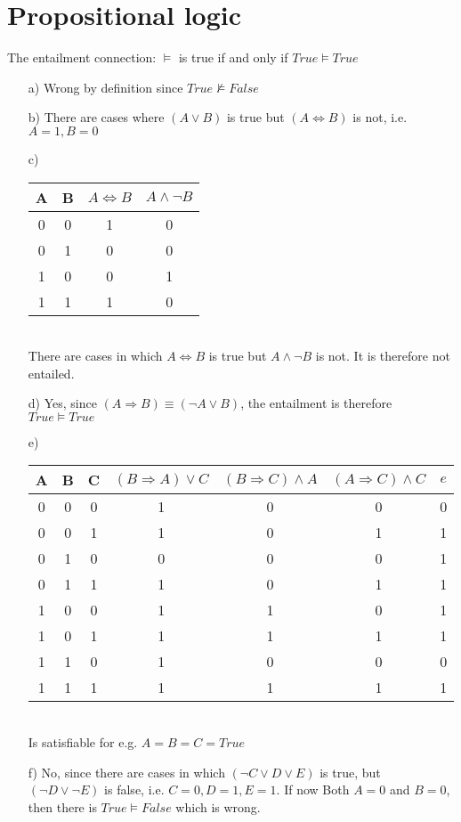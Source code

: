 \documentclass[a4paper]{article}
\begin{document}
\section{Propositional logic}
The entailment connection: $\vDash$ is true if and only if $True \vDash True$
\begin{itemize}
	\item[a)] Wrong by definition since $True \not \vDash False$
	\item[b)] There are cases where $(A \lor B)$ is true but $(A \Leftrightarrow B)$ is not, i.e. $A = 1, B = 0$
	\item[c)] 
	\begin{tabular}{c | c || c | c }
		A & B & $A \Leftrightarrow B$ & $A \land \neg B$ \\ \hline
		0 & 0 & 1 & 0 \\
		0 & 1 & 0 & 0 \\
		1 & 0 & 0 & 1 \\
		1 & 1 & 1 & 0 
	\end{tabular}\\
	There are cases in which $A \Leftrightarrow B$ is true but $A\land \neg B$ is not. It is therefore not entailed.
	\item[d)] Yes, since $(A \Rightarrow B) \equiv (\neg A \lor B)$, the entailment is therefore $True \vDash True$
	\item[e)] \begin{tabular}{c | c | c || c | c | c | c}
		A & B & C & $(B \Rightarrow A) \lor C$ & $(B \Rightarrow C) \land A$ & $(A \Rightarrow C) \land C$ & $e$ \\ \hline
		0 & 0 & 0 & 1 & 0 & 0 & 0\\
		0 & 0 & 1 & 1 & 0 & 1 & 1\\
		0 & 1 & 0 & 0 & 0 & 0 & 1\\
		0 & 1 & 1 & 1 & 0 & 1 & 1\\
		1 & 0 & 0 & 1 & 1 & 0 & 1\\
		1 & 0 & 1 & 1 & 1 & 1 & 1\\
		1 & 1 & 0 & 1 & 0 & 0 & 0\\
		1 & 1 & 1 & 1 & 1 & 1 & 1\\
	\end{tabular}\\
	Is satisfiable for e.g. $A = B = C = True$
	\item[f)] No, since there are cases in which $(\neg C \lor D \lor E)$ is true, but $(\neg D \lor \neg E)$ is false, i.e. $C = 0, D = 1, E = 1$. If now Both $A = 0$ and $B = 0$, then there is $True \vDash False$ which is wrong.

\end{itemize}
\end{document}
